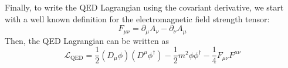 \documentclass[12pt]{article}
\newcommand{\delmu}{\partial_{\mu}}
\newcommand{\delnu}{\partial_{\nu}}
\newcommand{\+}{\dagger}
\begin{document}
Finally, to write the QED Lagrangian using the covariant derivative, we start with
a well known definition for the electromagnetic field strength tensor:
\begin{equation*}
    F_{\mu\nu} = \delmu A_{\nu} - \delnu A_{\mu}
\end{equation*}
Then, the QED Lagrangian can be written as
\begin{equation*}
    \mathcal{L}_{\text{QED}} = \frac{1}{2}(D_{\mu}\phi)(D^{\mu}\phi^{\dagger}) -
    \frac{1}{2}m^2\phi\phi^{\dagger} - \frac{1}{4}F_{\mu\nu}F^{\mu\nu}
\end{equation*}
\end{document}
